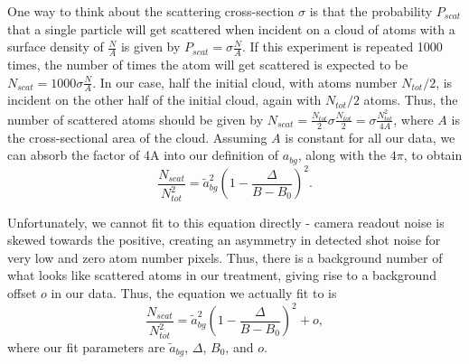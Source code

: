 \documentclass[12pt]{iopart}
\begin{document}
\par One way to think about the scattering cross-section $\sigma$ is that the probability $P_{scat}$ that a single particle will get scattered when incident on a cloud of atoms with a surface density of $\frac{N}{A}$ is given by $P_{scat}=\sigma \frac{N}{A}$. If this experiment is repeated 1000 times, the number of times the atom will get scattered is expected to be $N_{scat}=1000 \sigma \frac{N}{A}$.  In our case, half the initial cloud, with atoms number $N_{tot}/2$, is incident on the other half of the initial cloud, again with $N_{tot}/2$ atoms. Thus, the number of scattered atoms should be given by $N_{scat}=\frac{N_{tot}}{2} \sigma \frac{N_{tot}}{2}=\sigma \frac{N_{tot}^2}{4A}$, where $A$ is the cross-sectional area of the cloud. Assuming $A$ is constant for all our data, we can absorb the factor of 4A into our definition of $a_{bg}$, along with the $4\pi$, to obtain
\begin{equation}
\frac{N_{scat}}{N_{tot}^2}=\tilde{a}_{bg}^2\left(1-\frac{\Delta}{B-B_0}\right)^2.
\end{equation}
\par Unfortunately, we cannot fit to this equation directly - camera readout noise is skewed towards the positive, creating an asymmetry in detected shot noise for very low and zero atom number pixels. Thus, there is a background number of what looks like scattered atoms in our treatment, giving rise to a background offset $o$ in our data. Thus, the equation we actually fit to is
\begin{equation}
\frac{N_{scat}}{N_{tot}^2}=\tilde{a}_{bg}^2\left(1-\frac{\Delta}{B-B_0}\right)^2 + o,
\label{eq13}
\end{equation}
where our fit parameters are $\tilde{a}_{bg}$, $\Delta$, $B_0$, and $o$. 
\end{document}
